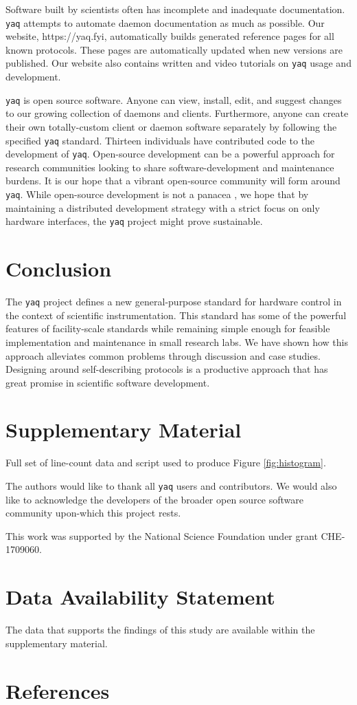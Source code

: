 \documentclass[aip, amsmath, amssymb, reprint,]{revtex4-2}
\newcommand\yaq{\texttt{yaq}}
\begin{document}
Software built by scientists often has incomplete and inadequate documentation. \cite{SegalJudith2007a}
\yaq{} attempts to automate daemon documentation as much as possible.
Our website, https://yaq.fyi, automatically builds generated reference pages for all known protocols.
These pages are automatically updated when new versions are published.
Our website also contains written and video tutorials on \yaq{} usage and development.

\yaq{} is open source software.
Anyone can view, install, edit, and suggest changes to our growing collection of daemons and clients.
Furthermore, anyone can create their own totally-custom client or daemon software separately by following the specified \yaq{} standard.
Thirteen individuals have contributed code to the development of \yaq{}.
Open-source development can be a powerful approach for research communities looking to share software-development and maintenance burdens. \cite{CohenJeremy2021a}
It is our hope that a vibrant open-source community will form around \yaq{}.
While open-source development is not a panacea \cite{NowogrodzkiAnna2019a}, we hope that by maintaining a distributed development strategy with a strict focus on only hardware interfaces, the \yaq{} project might prove sustainable.

\section{Conclusion}

The \yaq{} project defines a new general-purpose standard for hardware control in the context of scientific instrumentation.
This standard has some of the powerful features of facility-scale standards while remaining simple enough for feasible implementation and maintenance in small research labs.
We have shown how this approach alleviates common problems through discussion and case studies.
Designing around self-describing protocols is a productive approach that has great promise in scientific software development.

\section*{Supplementary Material}

Full set of line-count data and script used to produce Figure \ref{fig:histogram}.

\begin{acknowledgments}

The authors would like to thank all \yaq{} users and contributors.
We would also like to acknowledge the developers of the broader open source software community upon-which this project rests.

This work was supported by the National Science Foundation under grant CHE-1709060.

\end{acknowledgments}

\section*{Data Availability Statement}

The data that supports the findings of this study are available within the supplementary material.

\section*{References}
\nocite{*}

\end{document}
